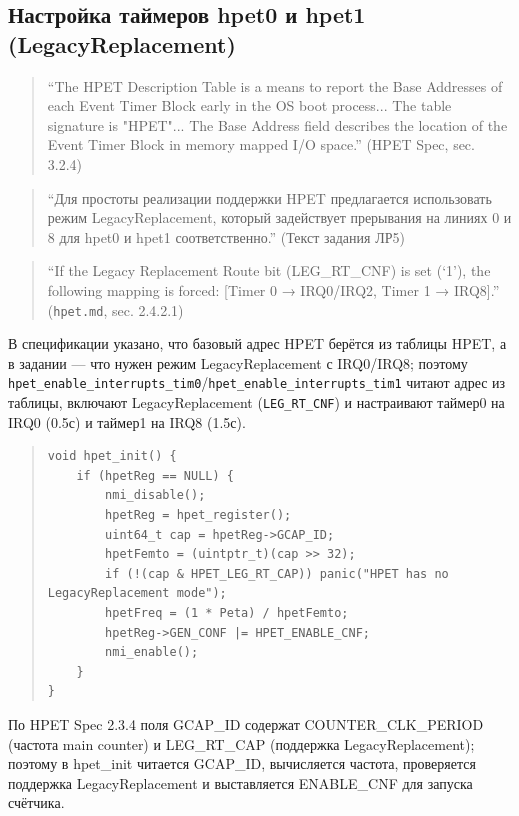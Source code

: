 \documentclass[a4paper,12pt]{article}
\begin{document}
\subsection{Настройка таймеров hpet0 и hpet1 (LegacyReplacement)}
\begin{quote}
``The HPET Description Table is a means to report the Base Addresses of each Event Timer Block early in the OS boot process... The table signature is "HPET"... The Base Address field describes the location of the Event Timer Block in memory mapped I/O space.'' (HPET Spec, sec. 3.2.4)
\end{quote}
\begin{quote}
``Для простоты реализации поддержки HPET предлагается использовать режим LegacyReplacement, который задействует прерывания на линиях 0 и 8 для hpet0 и hpet1 соответственно.'' (Текст задания ЛР5)
\end{quote}
\begin{quote}
``If the Legacy Replacement Route bit (LEG\_RT\_CNF) is set (‘1’), the following mapping is forced: [Timer 0 → IRQ0/IRQ2, Timer 1 → IRQ8].'' (\texttt{hpet.md}, sec. 2.4.2.1)
\end{quote}
В спецификации указано, что базовый адрес HPET берётся из таблицы HPET, а в задании — что нужен режим LegacyReplacement с IRQ0/IRQ8; поэтому \texttt{hpet\_enable\_interrupts\_tim0}/\texttt{hpet\_enable\_interrupts\_tim1} читают адрес из таблицы, включают LegacyReplacement (\texttt{LEG\_RT\_CNF}) и настраивают таймер0 на IRQ0 (0.5с) и таймер1 на IRQ8 (1.5с).
\begin{quote}\begin{verbatim}
void hpet_init() {
    if (hpetReg == NULL) {
        nmi_disable();
        hpetReg = hpet_register();
        uint64_t cap = hpetReg->GCAP_ID;
        hpetFemto = (uintptr_t)(cap >> 32);
        if (!(cap & HPET_LEG_RT_CAP)) panic("HPET has no LegacyReplacement mode");
        hpetFreq = (1 * Peta) / hpetFemto;
        hpetReg->GEN_CONF |= HPET_ENABLE_CNF;
        nmi_enable();
    }
}
\end{verbatim}\end{quote}
По HPET Spec 2.3.4 поля GCAP\_ID содержат COUNTER\_CLK\_PERIOD (частота main counter) и LEG\_RT\_CAP (поддержка LegacyReplacement); поэтому в hpet\_init читается GCAP\_ID, вычисляется частота, проверяется поддержка LegacyReplacement и выставляется ENABLE\_CNF для запуска счётчика.
\end{document}
